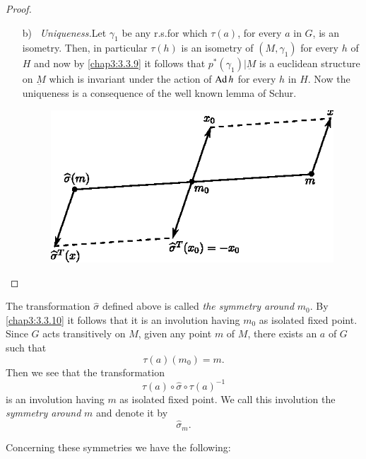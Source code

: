 \begin{proof}
\begin{itemize}
\item[b)]~{\em Uniqueness.}\pageoriginale Let $\gamma_{1}$ be any
  r.s.\@ for which 
  $\tau(a)$, for every $a$ in $G$, is an isometry. Then, in particular
  $\tau(h)$ is an isometry of $(M,\gamma_{1})$ for every $h$ of $H$
  and now by \eqref{chap3:3.3.9} it follows that
  $p^{\ast}(\gamma_{1})|\underbar{M}$ is a euclidean structure on
  $\underbar{M}$ which is invariant under the action of $\operatorname{Ad} h$ for
  every $h$ in $H$. Now the uniqueness is a consequence of the well
  known lemma of Schur.
\begin{figure}[H]
\centering
\includegraphics{chap3-fig1}
\end{figure}
\end{itemize}
\end{proof}

\begin{remark*}
The transformation $\widehat{\sigma}$ defined above is called {\em the
  symmetry around} $m_{0}$. By \eqref{chap3:3.3.10} it follows that it is an
involution having $m_{0}$ as isolated fixed point. Since $G$ acts
transitively on $M$, given any point $m$ of $M$, there exists an $a$
of $G$ such that
$$
\tau(a)(m_{0})=m.
$$\pageoriginale
Then we see that the transformation
\begin{equation*}
\tau(a)\circ\widehat{\sigma}\circ\tau(a)^{-1}\tag{3.3.16}\label{chap3:3.3.16}
\end{equation*}
is an involution having $m$ as isolated fixed point. We call this
involution the {\em symmetry around} $m$ and denote it by
\begin{equation*}
\widehat{\sigma}_{m}.\tag{3.3.17}\label{chap3:3.3.17}
\end{equation*}
\end{remark*}

Concerning these symmetries we have the following:

